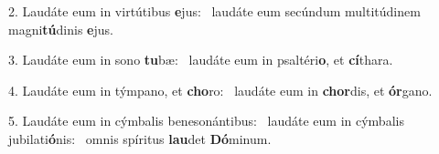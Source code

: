 2. Laudáte eum in virtútibus \textbf{e}jus: \ast\  laudáte eum secúndum multitúdinem magni\textbf{tú}dinis \textbf{e}jus.\

3. Laudáte eum in sono \textbf{tu}bæ: \ast\  laudáte eum in psaltéri\textbf{o}, et \textbf{cí}thara.\

4. Laudáte eum in týmpano, et \textbf{cho}ro: \ast\  laudáte eum in \textbf{chor}dis, et \textbf{ór}gano.\

5. Laudáte eum in cýmbalis benesonántibus: \dag\  laudáte eum in cýmbalis jubilati\textbf{ó}nis: \ast\  omnis spíritus \textbf{lau}det \textbf{Dó}minum.\

